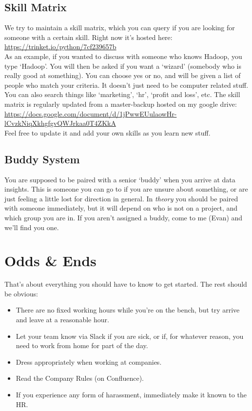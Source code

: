 \documentclass[11pt]{report}
\begin{document}
\subsection{Skill Matrix}
We try to maintain a skill matrix, which you can query if you are looking for someone with a certain skill. Right now it's hosted here:\\
\href{https://trinket.io/python/7cf239657b}{https://trinket.io/python/7cf239657b}\\
As an example, if you wanted to discuss with someone who knows Hadoop, you type `Hadoop'. You will then be asked if you want a `wizard' (somebody who is really good at something). You can choose yes or no, and will be given a list of people who match your criteria. It doesn't just need to be computer related stuff. You can also search things like `marketing', `hr', `profit and loss', etc. The skill matrix is regularly updated from a master-backup hosted on my google drive:\\
\href{https://docs.google.com/document/d/1jPwwEUulaowHr-lCvzkNiqXkhgfgvQWJrkaa0T4ZKkA/edit?usp=sharing}{\scriptsize https://docs.google.com/document/d/1jPwwEUulaowHr-lCvzkNiqXkhgfgvQWJrkaa0T4ZKkA}\\
Feel free to update it and add your own skills as you learn new stuff.

\subsection{Buddy System}
You are supposed to be paired with a senior `buddy' when you arrive at data insights. This is someone you can go to if you are unsure about something, or are just feeling a little lost for direction in general. In \emph{theory} you should be paired with someone immediately, but it will depend on who is not on a project, and which group you are in. If you aren't assigned a buddy, come to me (Evan) and we'll find you one.

\section{Odds \& Ends}
That's about everything you should have to know to get started. The rest should be obvious:
\begin{itemize}
\item There are no fixed working hours while you're on the bench, but try arrive and leave at a reasonable hour.
\item Let your team know via Slack if you are sick, or if, for whatever reason, you need to work from home for part of the day.
\item Dress appropriately when working at companies.
\item Read the Company Rules (on Confluence).
\item If you experience any form of harassment, immediately make it known to the HR.
\end{itemize}
\end{document}
